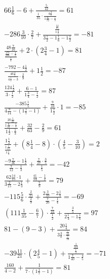 \documentclass{article}
\begin{document}
\begin{gather}
    66\frac{1}{6} - 6 + \frac{\frac{5}{42}}{\frac{1}{35} \cdot \frac{4\frac{3}{8}}{1\frac{47}{72} - \frac{7}{9}}} = 61 \\
    -286\frac{3}{10} \cdot \frac{2}{7} + \frac{\frac{\frac{14}{15}}{1\frac{2}{5}}}{3\frac{1}{2} - 1\frac{1}{6} - 1\frac{1}{2}} = -81 \\
    \frac{48\frac{7}{16}}{\frac{\frac{173}{288} - \frac{4}{9}}{\frac{1}{4}}} + 2 \cdot \left(2\frac{3}{4} - 1\right) = 81 \\
    \frac{-792 - 4\frac{1}{2}}{\frac{46\frac{2}{7}}{4\frac{1}{7} - 3} \cdot \frac{2}{9}} + 1\frac{1}{2} = -87 \\
    \frac{124\frac{1}{2}}{3 \cdot \frac{1}{2}} + \frac{6 - 1}{1\frac{3}{4} - \frac{1}{2}} = 87 \\
    \frac{-385\frac{1}{5}}{4\frac{9}{14} - \left(1\frac{1}{7} - 1\right)} + \frac{\frac{9}{10}}{1\frac{1}{2}} \cdot 1 = -85 \\
    \frac{\frac{20\frac{5}{21}}{1\frac{8}{21} - \frac{5}{7}}}{1\frac{1}{2} \cdot \frac{1}{3}} + \frac{32}{63} - \frac{2}{9} = 61 \\
    \frac{1\frac{1}{2}}{\frac{1\frac{1}{15}}{1\frac{1}{3}}} + \left(8\frac{1}{4} - 8\right) \cdot \left(\frac{4}{5} - \frac{3}{10}\right) = 2 \\
    \frac{-9\frac{7}{36} - 1\frac{1}{2}}{\frac{7}{12} - \frac{1}{3}} + \frac{\frac{7}{27} \cdot \frac{3}{5}}{\frac{1}{5}} = -42 \\
    \frac{62\frac{14}{15} \cdot 1}{3\frac{2}{15} - 2\frac{1}{3}} + \frac{\frac{41}{54} - \frac{1}{2}}{\frac{7}{9}} = 79 \\
    -115\frac{5}{6} \cdot \frac{\frac{2}{15}}{\frac{2}{9}} + \frac{2\frac{3}{10} - 2\frac{1}{4}}{\frac{7}{20} - \frac{1}{4}} = -69 \\
    \left(111\frac{1}{35} - \frac{6}{7}\right) \cdot \frac{\frac{7}{16}}{\frac{1}{2}} + \frac{\frac{3}{5}}{2\frac{1}{4} - 1\frac{1}{4}} = 97 \\
    81 - \left(9 - 3\right) + \frac{20\frac{1}{4}}{3\frac{3}{8} \cdot \frac{\frac{7}{15}}{\frac{7}{10}}} = 84 \\
    -39\frac{11}{21} \cdot \left(2\frac{4}{5} - 1\right) + \frac{\frac{\frac{3}{112}}{\frac{1}{2}}}{1\frac{7}{40} - \frac{4}{5}} = -71 \\
    \frac{160}{4 - 2} + \frac{1}{7 \cdot \left(1\frac{1}{7} - 1\right)} = 81
\end{gather}
\end{document}
